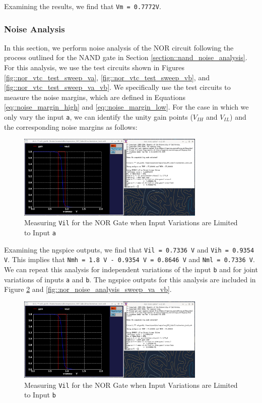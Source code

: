 \documentclass[fleqn]{article}
\begin{document}
	Examining the results, we find that \texttt{Vm = 0.7772V}.
	
	\subsubsection{Noise Analysis}
	
	In this section, we perform noise analysis of the NOR circuit following the process outlined for the NAND gate in Section \ref{section::nand_noise_analysis}. For this analysis, we use the test circuits shown in Figures \ref{fig::nor_vtc_test_sweep_va}, \ref{fig::nor_vtc_test_sweep_vb}, and \ref{fig::nor_vtc_test_sweep_va_vb}. We specifically use the test circuits to measure the noise margins, which are defined in Equations \ref{eq::noise_margin_high} and \ref{eq::noise_margin_low}. For the case in which we only vary the input \texttt{a}, we can identify the unity gain points ($V_{IH}$ and $V_{IL}$) and the corresponding noise margins as follows:
	
	\begin{figure}[H]
		\centerline{\includegraphics[width=0.8\textwidth]{nor_noise_analysis_sweep_va.png}}
		\caption{Measuring \texttt{Vil} for the NOR Gate when Input Variations are Limited to Input \texttt{a}}
		\label{fig::nor_noise_analysis_sweep_va}
	\end{figure}
	
	Examining the ngspice outputs, we find that \texttt{Vil = 0.7336 V} and \texttt{Vih = 0.9354 V}. This implies that \texttt{Nmh = 1.8 V - 0.9354 V = 0.8646 V} and \texttt{Nml = 0.7336 V}. We can repeat this analysis for independent variations of the input \texttt{b} and for joint variations of inputs \texttt{a} and \texttt{b}. The ngspice outputs for this analysis are included in Figure \ref{fig::nor_noise_analysis_sweep_vb} and \ref{fig::nor_noise_analysis_sweep_va_vb}.
	
	\begin{figure}[H]
		\centerline{\includegraphics[width=0.8\textwidth]{nor_noise_analysis_sweep_vb.png}}
		\caption{Measuring \texttt{Vil} for the NOR Gate when Input Variations are Limited to Input \texttt{b}}
		\label{fig::nor_noise_analysis_sweep_vb}
	\end{figure}
	
\end{document}
